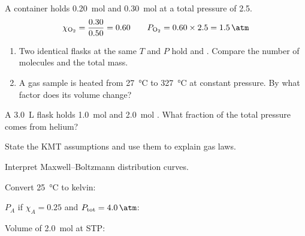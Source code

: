 \documentclass{apchem-notes}
\begin{document}
\begin{workedexample}
A container holds \SI{0.20}{\mole}  and \SI{0.30}{\mole}  at a
total pressure of \SI{2.5}{\atm}.
\[
  \chi_{\ce{O2}} = \frac{0.30}{0.50} = 0.60
  \qquad P_{\ce{O2}} = 0.60 \times 2.5 = \SI{1.5}{\atm}
\]
\end{workedexample}


\begin{enumerate}[leftmargin=*,itemsep=0.4em]
  \item Two identical flasks at the same $T$ and $P$ hold  and
        . Compare the number of molecules and the total mass.
  \item A gas sample is heated from \SI{27}{\celsius} to
        \SI{327}{\celsius} at constant pressure. By what factor does its
        volume change? 
\end{enumerate}

\begin{exitticket}
A \SI{3.0}{\liter} flask holds \SI{1.0}{\mole}  and \SI{2.0}{\mole}
. What fraction of the total pressure comes from helium?
\end{exitticket}


\begin{objectives}
  \item State the KMT assumptions and use them to explain gas laws.
  \item Interpret Maxwell--Boltzmann distribution curves.
\end{objectives}


\begin{warmup}[3]
  \item Convert \SI{25}{\celsius} to kelvin: 
  \item $P_A$ if $\chi_A = 0.25$ and $P_{\text{tot}} = \SI{4.0}{\atm}$:
  \item Volume of \SI{2.0}{\mole} at STP: 
\end{warmup}
\end{document}
